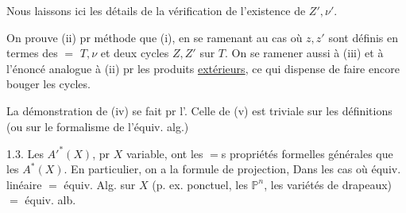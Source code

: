 
Nous laissons ici les détails de la vérification de l'existence de $Z',\nu'$.

On prouve (ii) pr  \inserted{$=$} méthode que (i),  en se ramenant au cas où $z,z'$ sont définis en termes des $=$ $T,\nu$ et deux cycles $Z,Z'$ sur $T$. On  se ramener aussi à (iii) et à l'énoncé analogue à (ii) pr les produits \uline{extérieurs}, ce qui dispense de faire encore bouger les cycles.

La démonstration de (iv) se fait pr l'. Celle de (v) est triviale sur les définitions (ou sur le formalisme de l'équiv. alg.)


 \uline{} 1.3. Les $A'^*(X)$, pr $X$ variable, ont les $=$s propriétés formelles générales que les $A^*(X)$. En particulier, on a la formule de projection, Dans les cas où équiv. linéaire $=$ équiv. Alg. sur $X$ (p. ex.  ponctuel, les $\mathbb P^n$, les variétés de drapeaux)  $=$ équiv. alb.

